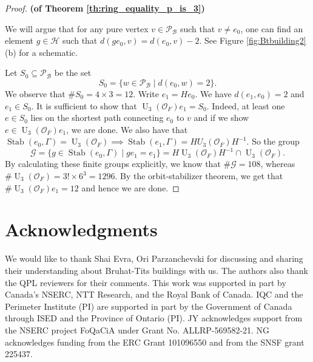 \documentclass{eptcs}
\theoremstyle{remark}
\theoremstyle{definition}
\DeclareMathOperator{\Stab}{Stab}
\DeclareMathOperator{\U}{U}
\begin{document}
\begin{proof}
{\bf (of Theorem \ref{th:ring_equality_p_is_3})}

    We will argue that for any pure vertex $v \in \mathcal{P}_{\mathcal{B}}$ such that $v \neq e_{0}$, one can find an element $g \in \mathcal{H}$ such that $d(g e_{0}, v) = d(e_{0},v) -2 $. See Figure \ref{fig:Btbuilding2}(b) for a schematic.

    Let $S_{0} \subseteq \mathcal{P}_{\mathcal{B}}$ be the set
    \begin{equation}
        S_{0} =\{w \in \mathcal{P}_{\mathcal{B}} \mid d(e_{0},w)=2\}.
    \end{equation}
    We observe that $\# S_{0} = 4 \times 3 = 12$. 
    Write $e_{1} = H e_{0}$. We have $d(e_{1},e_{0}) = 2$  and $e_{1} \in S_{0}$.
    It is  sufficient to show that $\U_{3}(\mathcal{O}_{F}) e_{1} = S_{0}$. Indeed, at least one $e \in S_{0}$ lies on the shortest path connecting $e_{0}$ to $v$ and if we show $e \in \U_{3}(\mathcal{O}_{F}) e_{1}$, we are done. 
    We also have that $\Stab(e_0,\Gamma) = \U_{3}(\mathcal{O}_{F}) \implies \Stab(e_{1},\Gamma) = H U_{3}(\mathcal{O}_{F})H^{-1}$. 
    So the group
    \begin{equation}
        \mathcal{G} = \{ g \in \Stab(e_{0},\Gamma) \mid g e_{1} = e_{1}\} = H \U_{3}(\mathcal{O}_{F}) H^{-1} \cap \U_{3}(\mathcal{O}_{F}).
    \end{equation}
    By calculating these finite groups explicitly, we know that $\# \mathcal{G} = 108$, whereas $\#\U_{3}(\mathcal{O}_{F}) =  3! \times 6^{3} = 1296$. By the orbit-stabilizer theorem, we get that $\# \U_{3}(\mathcal{O}_{F}) e_{1} = 12$ and hence we are done.
\end{proof}

\section{Acknowledgments}

We would like to thank Shai Evra, Ori Parzanchevski for discussing and sharing their understanding about Bruhat-Tits buildings with us. The authors also thank the QPL reviewers for their comments. This work was supported in part by Canada’s NSERC, NTT Research, and the Royal Bank of Canada. IQC and the Perimeter Institute (PI) are supported in part by the Government of Canada through ISED and the Province of Ontario (PI). JY acknowledges support from the NSERC project FoQaCiA under Grant No. ALLRP-569582-21. NG acknowledges funding
from the ERC Grant 101096550 and from the SNSF grant 225437.


\end{document}
